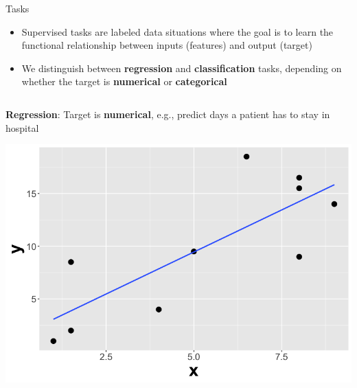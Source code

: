 \documentclass[11pt,compress,t,notes=noshow, xcolor=table]{beamer}
\begin{document}
 



\begin{vbframe}{Tasks}
\begin{itemize}
    \item Supervised tasks are labeled data situations where the goal is to learn the functional
        relationship between inputs (features) and output (target)
    
    \item We distinguish between \textbf{regression} and \textbf{classification} tasks, depending on whether the 
        target is \textbf{numerical} or \textbf{categorical}
\end{itemize}  

\lz

\begin{columns}    
\begin{column}{0.4\textwidth} 
\small \textbf{Regression}: Target is \textbf{numerical}, e.g., predict days a patient has to stay in hospital

  \begin{center}
    \includegraphics[width=\textwidth]{slides/ml-basics/figure/nutshell-ml-basics-supervised-regression-task.png} 
  \end{center}
\end{column}    


\end{columns}
\end{vbframe}
\end{document}
